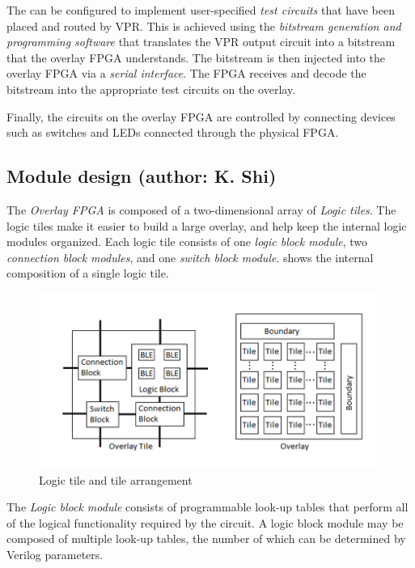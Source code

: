 The \overlay can be configured to implement user-specified \emph{test circuits} that have been placed and routed by VPR.
This is achieved using the \emph{bitstream generation and programming software} that translates the VPR output circuit into a bitstream that the overlay FPGA understands.
The bitstream is then injected into the overlay FPGA via a \emph{serial interface}.
The FPGA receives and decode the bitstream into the appropriate test circuits on the overlay.

Finally, the circuits on the overlay FPGA are controlled by connecting devices such as switches and LEDs connected through the physical FPGA.



\subsection{Module design (author: K. Shi)}

The \emph{Overlay FPGA} is composed of a two-dimensional array of \emph{Logic tiles}.
The logic tiles make it easier to build a large overlay, and help keep the internal 
logic modules organized.
Each logic tile consists of one \emph{logic block module}, two \emph{connection block modules}, 
and one \emph{switch block module}.
 shows the internal composition of a single logic tile.

\begin{figure}[!h]
	\centering
	\includegraphics[scale=0.7]{overlay.png}
	\caption{Logic tile and tile arrangement}
	\label{tile-diagram}
\end{figure}

The \emph{Logic block module} consists of programmable look-up tables that perform all of the logical 
functionality required by the circuit.
A logic block module may be composed of multiple look-up tables, the number of which 
can be determined by Verilog parameters.

